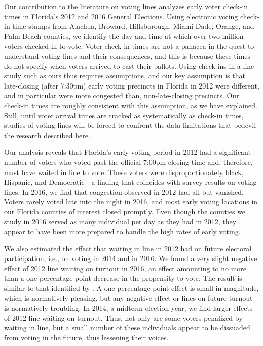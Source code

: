 \documentclass[12pt,titlepage]{article}
\begin{document}
Our contribution to the literature on voting lines analyzes early
voter check-in times in Florida's 2012 and 2016 General Elections.
Using electronic voting check-in time stamps from Alachua, Broward,
Hillsborough, Miami-Dade, Orange, and Palm Beach counties, we identify
the day and time at which over two million voters checked-in to vote.
Voter check-in times are not a panacea in the quest to understand
voting lines and their consequences, and this is because these times
do not specify when voters arrived to cast their ballots. Using
check-ins in a line study such as ours thus requires assumptions, and
our key assumption is that late-closing (after 7:30pm) early voting
precincts in Florida in 2012 were different, and in particular were
more congested than, non-late-closing precincts. Our check-in times
are roughly consistent with this assumption, as we have explained.
Still, until voter arrival times are tracked as systematically as
check-in times, studies of voting lines will be forced to confront the
data limitations that bedevil the research described here.

Our analysis reveals that Florida's early voting period in 2012 had a
significant number of voters who voted past the official 7:00pm
closing time and, therefore, must have waited in line to vote.  These
voters were disproportionately black, Hispanic, and Democratic---a
finding that coincides with survey results on voting lines.  In 2016,
we find that congestion observed in 2012 had all but vanished.  Voters
rarely voted late into the night in 2016, and most early voting
locations in our Florida counties of interest closed promptly.  Even
though the counties we study in 2016 served as many individual per day
as they had in 2012, they appear to have been more prepared to handle
the high rates of early voting.
  
We also estimated the effect that waiting in line in 2012 had on future
electoral participation, i.e., on voting in 2014 and in 2016.  We
found a very slight negative effect of 2012 line waiting on turnout in
2016, an effect amounting to no more than a one percentage point
decrease in the propensity to vote. The result is similar to that
identified by \citet{pettigrew:racegapwaittimes}.  A one percentage
point effect is small in magnitude, which is normatively pleasing, but
any negative effect or lines on future turnout is normatively
troubling.  In 2014, a midterm election year, we find larger effects
of 2012 line waiting on turnout.  Thus, not only are some voters
penalized by waiting in line, but a small number of these individuals
appear to be dissuaded from voting in the future, thus lessening their
voices.
\end{document}
